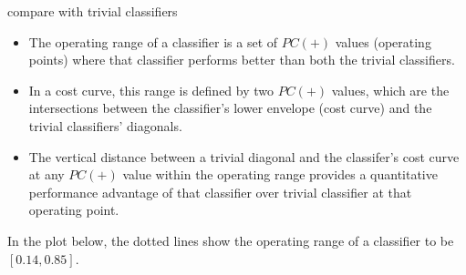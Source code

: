 \begin{vbframe}{compare with trivial classifiers}
  \begin{itemize}
    \item The operating range of a classifier is a set of $PC(+)$ values (operating points) where that classifier performs better than both the trivial classifiers.
    \item In a cost curve, this range is defined by two $PC(+)$ values, which are the intersections between the classifier's lower envelope (cost curve) and the trivial classifiers' diagonals.
    \item The vertical distance between a trivial diagonal and the classifer's cost curve at any $PC(+)$ value within the operating range provides a quantitative performance advantage of that classifier over trivial classifier at that operating point.
  \end{itemize}
  \pagebreak
  In the plot below, the dotted lines show the operating range of a classifier to be $[0.14, 0.85]$.
  \vfill
  \begin{figure}
    \centering
  \end{figure}
  
\end{vbframe}

